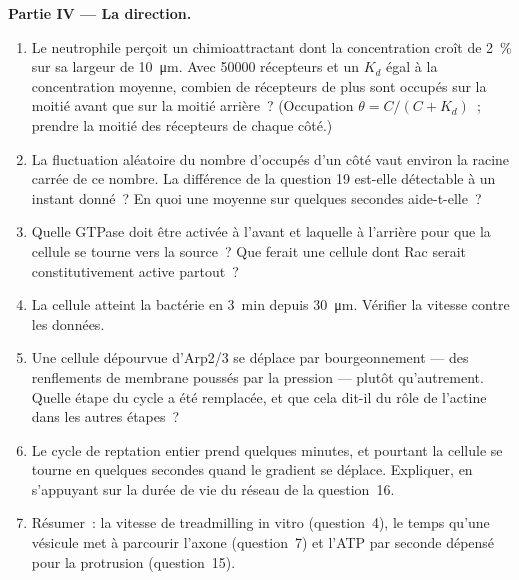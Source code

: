 \begin{problem}
\medskip
\noindent\textbf{Partie IV --- La direction.}
\begin{enumerate}[resume]
  \item Le neutrophile perçoit un chimioattractant dont la
        concentration croît de \qty{2}{\%} sur sa largeur de
        \qty{10}{\micro m}. Avec \num{50000} récepteurs et un $K_{d}$
        égal à la concentration moyenne, combien de récepteurs de plus
        sont occupés sur la moitié avant que sur la moitié arrière~?
        (Occupation $\theta = C/(C +
        K_{d})$~; prendre la moitié des récepteurs de chaque côté.)
  \item La fluctuation aléatoire du nombre d'occupés d'un côté vaut
        environ la racine carrée de ce nombre. La différence de la
        question 19 est-elle détectable à un instant donné~? En quoi
        une moyenne sur quelques secondes aide-t-elle~?
  \item Quelle GTPase doit être activée à l'avant et laquelle à
        l'arrière pour que la cellule se tourne vers la source~? Que
        ferait une cellule dont Rac serait constitutivement active
        partout~?
  \item La cellule atteint la bactérie en \qty{3}{min} depuis
        \qty{30}{\micro m}. Vérifier la vitesse contre les données.
  \item Une cellule dépourvue d'Arp2/3 se déplace par bourgeonnement
        --- des renflements de membrane poussés par la pression ---
        plutôt qu'autrement. Quelle étape du cycle a été remplacée, et
        que cela dit-il du rôle de l'actine dans les autres étapes~?
  \item Le cycle de reptation entier prend quelques minutes, et pourtant
        la cellule se tourne en quelques secondes quand le gradient se
        déplace. Expliquer, en s'appuyant sur la durée de vie du réseau
        de la question~16.
  \item Résumer~: la vitesse de treadmilling in vitro (question~4), le
        temps qu'une vésicule met à parcourir l'axone (question~7) et
        l'ATP par seconde dépensé pour la protrusion (question~15).
\end{enumerate}
\end{problem}
